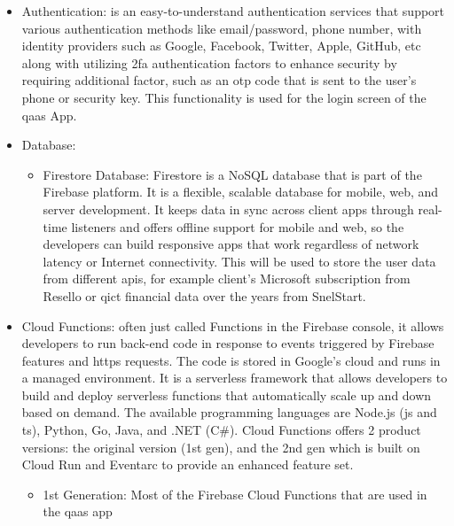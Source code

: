 \begin{itemize}
      \item Authentication: is an easy-to-understand authentication services that support various authentication
            methods like email/password, phone number, with identity providers such as Google, Facebook, Twitter,
            Apple, GitHub, \acrshort{etc}
            along with utilizing \acrshort{2fa} authentication factors to enhance security by requiring additional
            factor, such as an \acrshort{otp} code that is sent to the user's phone or security key. This functionality
            is used for the login screen of the \acrshort{qaas} App.
      \item Database:
            \begin{itemize}
                  \item Firestore Database: Firestore is a \gls{NoSQL} database that is part of the Firebase
                        platform. It is a flexible, scalable database for mobile, web, and server development. It keeps
                        data in sync across client apps through real-time listeners and offers offline support for mobile
                        and web, so the developers can build responsive apps that work regardless of network latency or
                        Internet connectivity. This will be used to store the user data from different \acrshort{api}s,
                        for example client's Microsoft subscription from Resello or \acrshort{qict} financial data
                        over the years from SnelStart.
            \end{itemize}
      \item Cloud Functions: often just called Functions in the Firebase console, it allows developers to run
            back-end code in response to events triggered by Firebase features and \acrshort{https} requests.
            The code is stored in Google's cloud and runs in a managed environment. It is a serverless framework
            that allows developers to build and deploy serverless functions that automatically scale up and down
            based on demand. The available programming languages are Node.js (\acrshort{js} and \acrshort{ts}),
            Python, Go, Java, and .NET (C\#). Cloud Functions offers 2 product versions: the original version
            (1st gen), and the 2nd gen which is built on Cloud Run and Eventarc to provide an enhanced feature set.
            \begin{itemize}
                  \item 1st Generation: Most of the Firebase Cloud Functions that are used in the \acrshort{qaas} app

\end{itemize}
\end{itemize}
